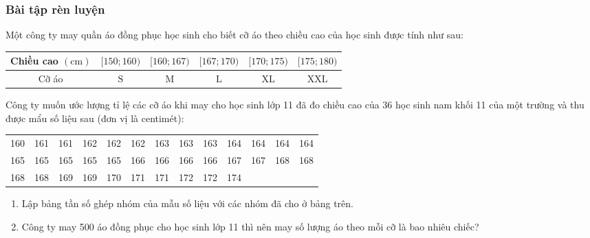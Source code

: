 \subsubsection{Bài tập rèn luyện}
\centerline{}
\begin{bt}
	Một công ty may quần áo đồng phục học sinh cho biết cỡ áo theo chiều cao của học sinh được tính như sau:
	\begin{center}
		\begin{tabular}{|c|c|c|c|c|c|}
			\hline Chiều cao $(\mathrm{cm})$ & {$[150 ; 160)$} & {$[160 ; 167)$} & {$[167 ; 170)$} & {$[170 ; 175)$} & {$[175 ; 180)$} \\
			\hline Cỡ áo & $\mathrm{S}$ & $\mathrm{M}$ & $\mathrm{L}$ & $\mathrm{XL}$ & $\mathrm{XXL}$ \\
			\hline
		\end{tabular}
	\end{center}
	Công ty muốn ước lượng tỉ lệ các cỡ áo khi may cho học sinh lớp 11 đã đo chiều cao của 36 học sinh nam khối 11 của một trường và thu được mẩu số liệu sau (đơn vị là centimét):
	\begin{center}
		\begin{tabular}{lllllllllllll}
			160 & 161 & 161 & 162 & 162 & 162 & 163 & 163 & 163 & 164 & 164 & 164 & 164 \\ 
			165 & 165 & 165 & 165 & 165 & 166 & 166 & 166 & 166 & 167 & 167 & 168 & 168 \\ 
			168 & 168 & 169 & 169 & 170 & 171 & 171 & 172 & 172 & 174 & & & 
		\end{tabular}
	\end{center}
	\begin{enumerate}
		\item Lập bảng tần số ghép nhóm của mẫu số liệu với các nhóm đã cho ở bảng trên.
		\item Công ty may 500 áo đồng phục cho học sinh lớp 11 thì nên may số lượng áo theo mỗi cỡ là bao nhiêu chiếc?
	\end{enumerate}
	\loigiai{
		\begin{enumerate}
			\item Bảng tần số ghép nhóm
			\begin{center}
				\begin{tabular}{|c|c|c|c|c|c|}
					\hline Chiều cao $(\mathrm{cm})$ & {$[150 ; 160)$} & {$[160 ; 167)$} & {$[167 ; 170)$} & {$[170 ; 175)$} & {$[175 ; 180)$} \\
					\hline Số học sinh &0& 22 & 8 & 6 & 0 \\

\end{tabular}
\end{center}
\end{enumerate}}
\end{bt}
